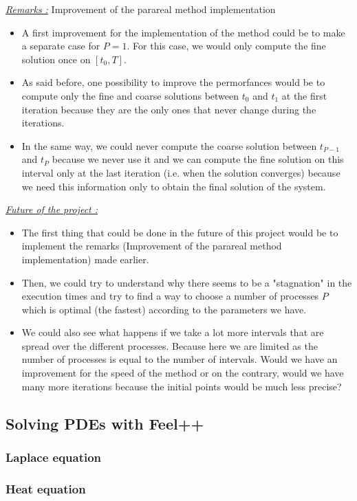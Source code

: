 \noindent \underline{\textit{Remarks :}} Improvement of the parareal method implementation 

\begin{itemize}[label=-]
	\item A first improvement for the implementation of the method could be to make a separate case for $P=1$. For this case, we would only compute the fine solution once on $[t_0,T]$.
	\item As said before, one possibility to improve the permorfances would be to compute only the fine and coarse solutions between $t_0$ and $t_1$ at the first iteration because they are the only ones that never change during the iterations. 
	\item In the same way, we could never compute the coarse solution between $t_{P-1}$ and $t_P$ because we never use it and we can compute the fine solution on this interval only at the last iteration (i.e. when the solution converges) because we need this information only to obtain the final solution of the system.
\end{itemize}

\noindent \underline{\textit{Future of the project :}}

\begin{itemize}[label=-]
	\item The first thing that could be done in the future of this project would be to implement the remarks (Improvement of the parareal method implementation) made earlier.
	\item Then, we could try to understand why there seems to be a "stagnation" in the execution times and try to find a way to choose a number of processes $P$ which is optimal (the fastest) according to the parameters we have.
	\item We could also see what happens if we take a lot more intervals that are spread over the different processes. Because here we are limited as the number of processes is equal to the number of intervals. Would we have an improvement for the speed of the method or on the contrary, would we have many more iterations because the initial points would be much less precise?
\end{itemize}



\subsection{Solving PDEs with Feel++}

\subsubsection{Laplace equation}

\subsubsection{Heat equation}
\label{heat}